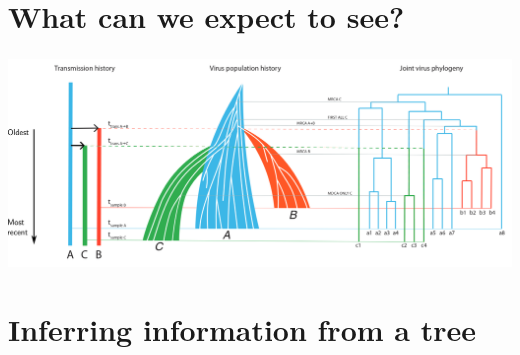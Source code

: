 \documentclass[aspectratio=169]{beamer}
\begin{document}
\section{What can we expect to see?} %

\begin{frame} \frametitle{\insertsection}
    \begin{center}
        \centering\includegraphics[width=\textwidth]{images/thomas-figure}
    \end{center}
\end{frame}

\section{Inferring information from a tree}
\end{document}
